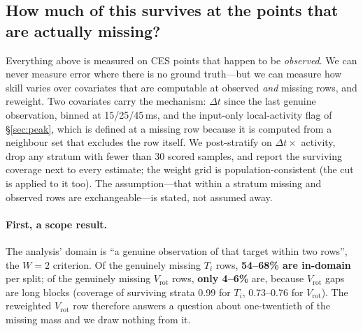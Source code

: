 \documentclass[10pt]{article}
\newcommand{\Ti}{\ensuremath{T_i}}
\newcommand{\Vrot}{\ensuremath{V_\mathrm{rot}}}
\begin{document}
\subsection{How much of this survives at the points that are actually missing?}
\label{sec:mnar}

Everything above is measured on CES points that happen to be \emph{observed}. We
can never measure error where there is no ground truth---but we can measure how
skill varies over covariates that are computable at observed \emph{and} missing
rows, and reweight. Two covariates carry the mechanism: $\Delta t$ since the last
genuine observation, binned at 15/25/45\,ms, and the input-only local-activity
flag of \S\ref{sec:peak}, which is defined at a missing row because it is computed
from a neighbour set that excludes the row itself. We post-stratify on
$\Delta t \times$ activity, drop any stratum with fewer than 30 scored samples,
and report the surviving coverage next to every estimate; the weight grid is
population-consistent (the cut is applied to it too). The assumption---that within
a stratum missing and observed rows are exchangeable---is stated, not assumed away.

\paragraph{First, a scope result.} The analysis' domain is ``a genuine observation
of that target within two rows'', the $W{=}2$ criterion. Of the genuinely missing
\Ti{} rows, \textbf{54--68\% are in-domain} per split; of the genuinely missing
\Vrot{} rows, \textbf{only 4--6\%} are, because \Vrot{} gaps are long blocks
(coverage of surviving strata 0.99 for \Ti{}, 0.73--0.76 for \Vrot{}). The
reweighted \Vrot{} row therefore answers a question about one-twentieth of the
missing mass and we draw nothing from it.
\end{document}
